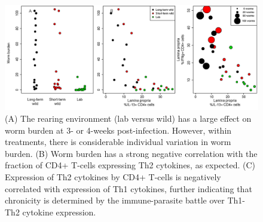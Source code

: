 \documentclass[12pt,reqno,final,pdftex]{amsart}\usepackage[]{graphicx}\usepackage[]{color}
\newenvironment{knitrout}{}{} %
\theoremstyle{plain}
\numberwithin{equation}{part}
\begin{document}
\begin{knitrout}\scriptsize
{}\color{fgcolor}\begin{figure}

\includegraphics[width=\linewidth]{figure/unnamed-chunk-8-1} \hfill{}

\caption[(A) The rearing environment (lab versus wild) has a large effect on worm burden at 3- or 4-weeks post-infection]{(A) The rearing environment (lab versus wild) has a large effect on worm burden at 3- or 4-weeks post-infection. However, within treatments, there is considerable individual variation in worm burden. (B) Worm burden has a strong negative correlation with the fraction of CD4+ T-cells expressing Th2 cytokines, as expected. (C) Expression of Th2 cytokines by CD4+ T-cells is negatively correlated with expression of Th1 cytokines, further indicating that chronicity is determined by the immune-parasite battle over Th1-Th2 cytokine expression.}\label{fig:unnamed-chunk-8}
\end{figure}


\end{knitrout}
\end{document}
